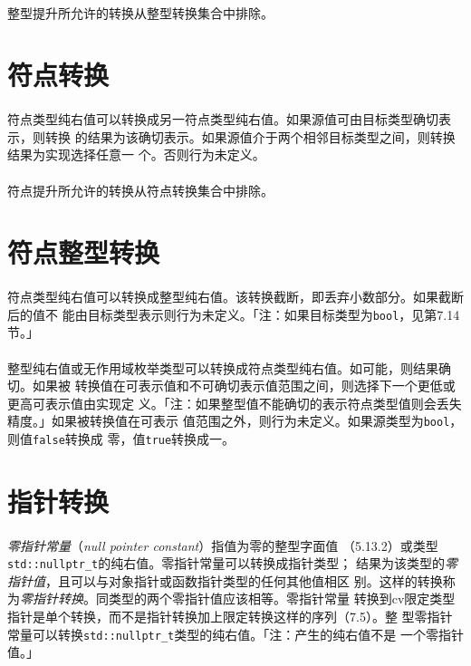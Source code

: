 \paragraph{}
整型提升所允许的转换从整型转换集合中排除。

\section{符点转换}
\paragraph{}
符点类型纯右值可以转换成另一符点类型纯右值。如果源值可由目标类型确切表示，则转换
的结果为该确切表示。如果源值介于两个相邻目标类型之间，则转换结果为实现选择任意一
个。否则行为未定义。

\paragraph{}
符点提升所允许的转换从符点转换集合中排除。

\section{符点整型转换}
\paragraph{}
符点类型纯右值可以转换成整型纯右值。该转换截断，即丢弃小数部分。如果截断后的值不
能由目标类型表示则行为未定义。「注：如果目标类型为\texttt{bool}，见第7.14节。」

\paragraph{}
整型纯右值或无作用域枚举类型可以转换成符点类型纯右值。如可能，则结果确切。如果被
转换值在可表示值和不可确切表示值范围之间，则选择下一个更低或更高可表示值由实现定
义。「注：如果整型值不能确切的表示符点类型值则会丢失精度。」如果被转换值在可表示
值范围之外，则行为未定义。如果源类型为\texttt{bool}，则值\texttt{false}转换成
零，值\texttt{true}转换成一。

\section{指针转换}
\paragraph{}
\textit{零指针常量}（\textit{null pointer constant}）指值为零的整型字面值
（5.13.2）或类型\texttt{std::nullptr\_t}的纯右值。零指针常量可以转换成指针类型；
结果为该类型的\textit{零指针值}，且可以与对象指针或函数指针类型的任何其他值相区
别。这样的转换称为\textit{零指针转换}。同类型的两个零指针值应该相等。零指针常量
转换到cv限定类型指针是单个转换，而不是指针转换加上限定转换这样的序列（7.5）。整
型零指针常量可以转换\texttt{std::nullptr\_t}类型的纯右值。「注：产生的纯右值不是
一个零指针值。」

